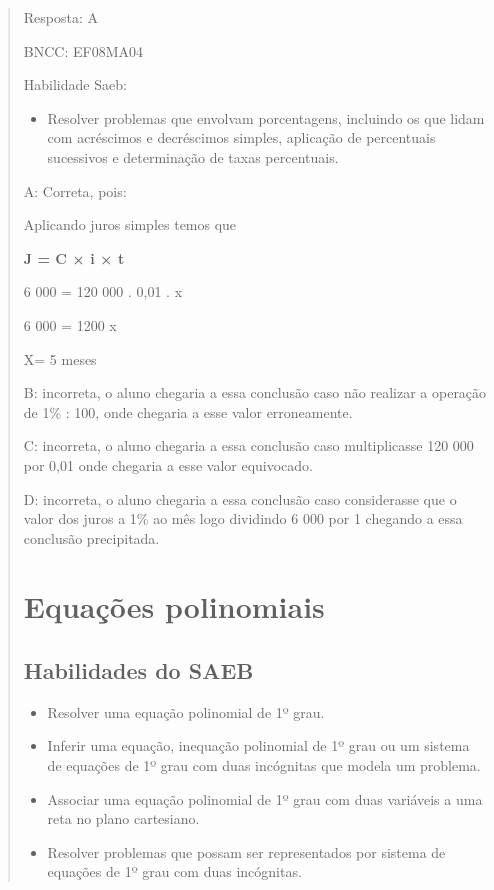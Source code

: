 \begin{quote}
\begin{escolha}
Resposta: A

BNCC: EF08MA04

Habilidade Saeb:

\begin{itemize}
\tightlist
\item
  Resolver problemas que envolvam porcentagens, incluindo os que lidam
  com acréscimos e decréscimos simples, aplicação de percentuais
  sucessivos e determinação de taxas percentuais.
\end{itemize}

A: Correta, pois:

Aplicando juros simples temos que

\textbf{J = C × i × t}

6 000 = 120 000 . 0,01 . x

6 000 = 1200 x

X= 5 meses

B: incorreta, o aluno chegaria a essa conclusão caso não realizar a
operação de 1\% : 100, onde chegaria a esse valor erroneamente.

C: incorreta, o aluno chegaria a essa conclusão caso multiplicasse 120
000 por 0,01 onde chegaria a esse valor equivocado.

D: incorreta, o aluno chegaria a essa conclusão caso considerasse que o
valor dos juros a 1\% ao mês logo dividindo 6 000 por 1 chegando a essa
conclusão precipitada.

\chapter{Equações polinomiais}

\section{Habilidades do SAEB}

\begin{itemize}
\item
  Resolver uma equação polinomial de 1º grau.
\item
  Inferir uma equação, inequação polinomial de 1º grau ou um sistema de
  equações de 1º grau com duas incógnitas que modela um problema.
\item
  Associar uma equação polinomial de 1º grau com duas variáveis a uma
  reta no plano cartesiano.
\item
  Resolver problemas que possam ser representados por sistema de
  equações de 1º grau com duas incógnitas.
\end{itemize}


\end{escolha}
\end{quote}
